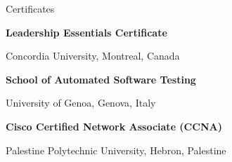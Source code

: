 
\begin{rubric}{Certificates}

    \entry*[July 2018] \textbf{Leadership Essentials Certificate}
    \par Concordia University, Montreal, Canada

    \entry*[May 2017] \textbf{School of Automated Software Testing}
    \par University of Genoa, Genova, Italy

    \entry*[May 2015] \textbf{Cisco Certified Network Associate (CCNA)}
    \par Palestine Polytechnic University, Hebron, Palestine
\end{rubric}
